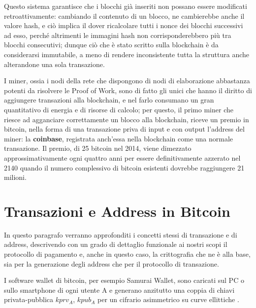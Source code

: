 Questo sistema garantisce che i blocchi già inseriti non possano essere modificati retroattivamente: cambiando il contenuto di un blocco, ne cambierebbe anche il valore hash, e ciò implica il dover ricalcolare tutti i nonce dei blocchi successivi ad esso, perché altrimenti le immagini hash non corrisponderebbero più tra blocchi consecutivi; dunque ciò che è stato scritto sulla blockchain è da considerarsi immutabile, a meno di rendere inconsistente tutta la struttura anche alterandone una sola transazione.

I miner, ossia i nodi della rete che dispongono di nodi di elaborazione abbastanza potenti da risolvere le Proof of Work, sono di fatto gli unici che hanno il diritto di aggiungere transazioni alla blockchain, e nel farlo consumano un gran quantitativo di energia e di risorse di calcolo; per questo, il primo miner che riesce ad agganciare correttamente un blocco alla blockchain, riceve un premio in bitcoin, nella forma di una transazione priva di input e con output l’address del miner: la \textbf{coinbase}, registrata anch’essa nella blockchain come una normale transazione. Il premio, di 25 bitcoin nel 2014, viene dimezzato approssimativamente ogni quattro anni per essere deﬁnitivamente azzerato nel 2140 quando il numero complessivo di bitcoin esistenti dovrebbe raggiungere 21 milioni.
\section{Transazioni e Address in Bitcoin}\label{Transazioni}
In questo  paragrafo verranno approfonditi i concetti stessi di transazione e di address, descrivendo con un grado di dettaglio funzionale ai nostri scopi il protocollo di pagamento e, anche in questo caso, la crittografia che ne è alla base, sia per la generazione degli address che per il protocollo di transazione.

I software wallet di bitcoin, per esempio Samurai Wallet, sono caricati sul PC o sullo smartphone di ogni utente A e generano anzitutto una coppia di chiavi privata-pubblica $kprv_A$, $kpub_A$ per un cifrario asimmetrico su curve ellittiche \cite{curve}.

